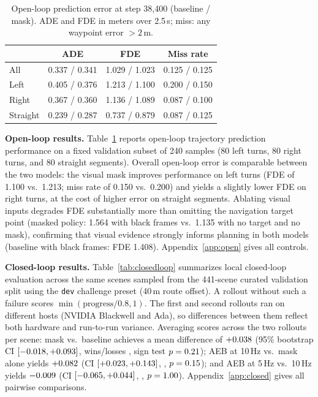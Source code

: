 \documentclass{article}
\begin{document}
\begin{table}
\centering\footnotesize
\caption{Open-loop prediction error at step 38{,}400 (baseline / mask). ADE and FDE in meters over 2.5\,s; miss: any waypoint error $>2$\,m.}
\label{tab:openloop}
\begin{tabular}{@{}lccc@{}}
\toprule
 & ADE & FDE & Miss rate \\
\midrule
All & 0.337 / 0.341 & 1.029 / 1.023 & 0.125 / 0.125 \\
Left & 0.405 / 0.376 & 1.213 / 1.100 & 0.200 / 0.150 \\
Right & 0.367 / 0.360 & 1.136 / 1.089 & 0.087 / 0.100 \\
Straight & 0.239 / 0.287 & 0.737 / 0.879 & 0.087 / 0.125 \\
\bottomrule
\end{tabular}
\end{table}
\textbf{Open-loop results.} Table~\ref{tab:openloop} reports open-loop trajectory prediction performance on a fixed validation subset of 240 samples (80 left turns, 80 right turns, and 80 straight segments). Overall open-loop error is comparable between the two models: the visual mask improves performance on left turns (FDE of 1.100 vs.\ 1.213; miss rate of 0.150 vs.\ 0.200) and yields a slightly lower FDE on right turns, at the cost of higher error on straight segments. Ablating visual inputs degrades FDE substantially more than omitting the navigation target point (masked policy: 1.564 with black frames vs.\ 1.135 with no target and no mask), confirming that visual evidence strongly informs planning in both models (baseline with black frames: FDE 1.408). Appendix~\ref{app:open} gives all controls.

\textbf{Closed-loop results.} Table~\ref{tab:closedloop} summarizes local closed-loop evaluation across the same \RNScenes{} scenes sampled from the 441-scene curated validation split using the \texttt{dev} challenge preset (40\,m route offset). A rollout without such a failure scores $\min(\mathrm{progress}/0.8,1)$. The first and second rollouts ran on different hosts (NVIDIA Blackwell and Ada), so differences between them reflect both hardware and run-to-run variance. Averaging scores across the two rollouts per scene: mask vs.\ baseline achieves a mean difference of $+0.038$ (95\% bootstrap CI $[-0.018,+0.093]$, wins/losses \RMaskWL, sign test $p=0.21$); AEB at 10\,Hz vs.\ mask alone yields $+0.082$ (CI $[+0.023,+0.143]$, \RAebWL, $p=0.15$); and AEB at 5\,Hz vs.\ 10\,Hz yields $-0.009$ (CI $[-0.065,+0.044]$, \RAebFiveWL, $p=1.00$). Appendix~\ref{app:closed} gives all pairwise comparisons.
\end{document}
